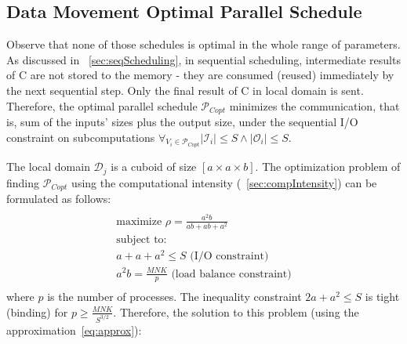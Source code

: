 \documentclass[sigplan,review,anonymous]{acmart}\settopmatter{printfolios=true,printccs=false,printacmref=false}
\newcommand\greg[1]{\textcolor{blue}{[Greg: #1]}}
\newcommand\mac[1]{\textcolor{red}{[Mac: #1]}}
\begin{document}
%
%
%


\subsection{Data Movement Optimal Parallel Schedule}
\label{sec:parScheduling}
Observe that none of those schedules is optimal in the whole range of 
parameters.
As discussed in ~\cref{sec:seqScheduling}, in sequential 
scheduling, 
intermediate results of C are not stored to the memory - they are 
consumed 
(reused) immediately by the next sequential step. Only the final 
result of C in 
local domain is sent. Therefore, the optimal parallel schedule 
$\mathcal{P}_{Copt}$
minimizes the 
communication, that is, sum of the inputs' sizes plus the output 
size, under 
the sequential I/O constraint on subcomputations $\forall_{V_i \in 
\mathcal{P}_{Copt}} |\mathcal{I}_i| \le S \land |\mathcal{O}_i| \le S$.

The local domain $\mathcal{D}_j$ is a cuboid of size $[a \times a \times b]$. 
The optimization problem of finding $\mathcal{P}_{Copt}$
using the 
computational intensity (~\cref{sec:compIntensity}) can be 
formulated as 
follows:
\begin{multline}
\label{eq:tileEq}
\\
\text{maximize } \rho = \frac{a^2b}{ab + ab + a^2}\\
\text{subject to: } \\
a + a + a^2 \le S \text{ (I/O constraint)} \\
a^2b = \frac{MNK}{p} \text{ (load balance constraint)} \\ 
\end{multline}
where $p$ is the number of processes. The inequality constraint $2a + 
a^2 \le 
S$ is tight (binding) for $p \ge \frac{MNK}{S^{3/2}}$. Therefore, the solution 
to this problem (using the 
approximation~\ref{eq:approx}):
\end{document}
